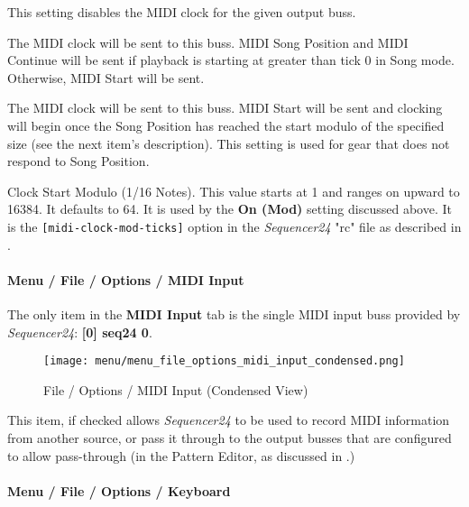    This setting disables the MIDI clock for the given output buss.

   The MIDI clock will be sent to this buss.
   MIDI Song Position and MIDI Continue will be sent if playback is starting
   at greater than tick 0 in Song mode.  Otherwise, MIDI Start will be sent.

   The MIDI clock will be sent to this buss.
   MIDI Start will be sent and clocking will begin
   once the Song Position has reached the start modulo of the specified size
   (see the next item's description).
   This setting is used for gear that does not respond to Song Position.

   Clock Start Modulo (1/16 Notes).
   This value starts at 1 and ranges on upward to 16384.
   It  defaults to 64.
   It is used by the \textbf{On (Mod)} setting discussed above.
   It is the \texttt{[midi-clock-mod-ticks]} option in the \textsl{Sequencer24}
   "rc" file as described in
   .


\paragraph{Menu / File / Options / MIDI Input}
\label{paragraph:seq24_menu_file_options_midi_input}

   The only item in the \textbf{MIDI Input} tab is the single MIDI input
   buss provided by \textsl{Sequencer24}:  \textbf{[0] seq24 0}.

\begin{figure}[H]
   \centering 
   \texttt{[image: menu/menu\_file\_options\_midi\_input\_condensed.png]}
   \caption{File / Options / MIDI Input (Condensed View)}
   \label{fig:seq24_menu_file_options_midi_input}
\end{figure}

   This item, if checked allows \textsl{Sequencer24} to be used to record MIDI
   information from another source, or pass it through to the output busses
   that are configured
   to allow pass-through
   (in the Pattern Editor, as discussed in 
   .)

\paragraph{Menu / File / Options / Keyboard }
\label{paragraph:seq24_menu_file_options_keyboard}

